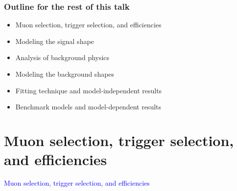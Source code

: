 \documentclass[compress]{beamer}
\begin{document}
\begin{frame}
\frametitle{Outline for the rest of this talk}
\begin{itemize}\setlength{\itemsep}{0.5 cm}
\item Muon selection, trigger selection, and efficiencies
\item Modeling the signal shape
\item Analysis of background physics
\item Modeling the background shapes
\item Fitting technique and model-independent results
\item Benchmark models and model-dependent results
\end{itemize}
\end{frame}

\section*{Muon selection, trigger selection, and efficiencies}
\begin{frame}
\begin{center}
\Huge \textcolor{blue}{Muon selection, trigger selection, and efficiencies}
\end{center}
\end{frame}
\end{document}
